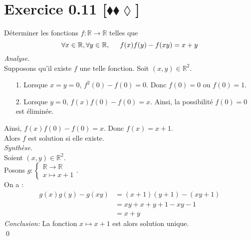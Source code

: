 \documentclass[10pt]{article}
\begin{document}
\section*{Exercice 0.11 [$\blacklozenge\blacklozenge\lozenge$]}
\begin{tcolorbox}[enhanced, width=7in, center, size=fbox, fontupper=\large, drop shadow southwest]
    Déterminer les fonctions $f: \mathbb{R} \rightarrow \mathbb{R}$ telles que 
    \begin{equation*}
        \forall{x\in\mathbb{R},\forall{y\in\mathbb{R}}, \hspace{0.5cm} f(x)f(y) - f(xy) = x + y}
    \end{equation*}
    \emph{Analyse.}\\
    Supposons qu'il existe $f$ une telle fonction. Soit $(x,y)\in\mathbb{R}^2$.
    \begin{itemize}
        \item[1.] Lorsque $x=y=0$, $f^2(0)-f(0)=0$. Donc $f(0) = 0$ ou $f(0) = 1$.
        \item[2.] Lorsque $y=0$, $f(x)f(0)-f(0)=x$. Ainsi, la possibilité $f(0)=0$ est éliminée.
    \end{itemize}
    Ainsi, $f(x)f(0)-f(0)=x$. Donc $f(x)=x+1$.\\
    Alors $f$ est solution si elle existe.\\[0.25cm]
    \emph{Synthèse.}\\
    Soient $(x,y)\in\mathbb{R}^2$.\\
    Posons $g: \begin{cases}\mathbb{R}\rightarrow\mathbb{R}\\x\mapsto{x+1}\end{cases}$.\\
    On a :
    \begin{align*}
        g(x)g(y)-g(xy)
        &=(x+1)(y+1)-(xy+1)\\
        &=xy+x+y+1-xy-1\\
        &=x+y
    \end{align*}
    \emph{Conclusion:}
    La fonction $x\mapsto x+1$ est alors solution unique.\\
    \qed
\end{tcolorbox}
\end{document}
